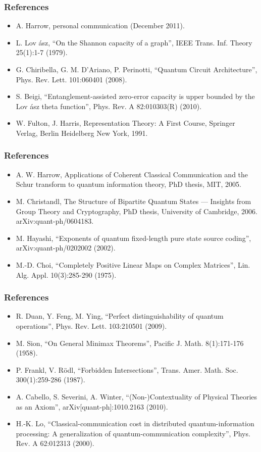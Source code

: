 \documentclass{beamer}
\begin{document}
\begin{frame}
\frametitle{References}

\begin{itemize}
\item A. Harrow, personal communication (December 2011).
\item L. Lov \'{a}sz, “On the Shannon capacity of a graph”, IEEE Trans. Inf. Theory 25(1):1-7 (1979).
\item G. Chiribella, G. M. D’Ariano, P. Perinotti, “Quantum Circuit Architecture”, Phys. Rev. Lett. 101:060401
(2008).
\item S. Beigi, “Entanglement-assisted zero-error capacity is upper bounded by the Lov \'{a}sz theta function”,
Phys. Rev. A 82:010303(R) (2010).
\item W. Fulton, J. Harris, Representation Theory: A First Course, Springer Verlag, Berlin Heidelberg New
York, 1991.

\end{itemize}
\end{frame}

\begin{frame}
\frametitle{References}

\begin{itemize}
\item   A. W. Harrow, Applications of Coherent Classical Communication and the Schur transform to quantum information theory, PhD thesis, MIT, 2005.
\item M. Christandl, The Structure of Bipartite Quantum States — Insights from Group Theory and Cryptography,
PhD thesis, University of Cambridge, 2006. arXiv:quant-ph/0604183.
\item M. Hayashi, “Exponents of quantum fixed-length pure state source coding”, arXiv:quant-ph/0202002
(2002).
\item M.-D. Choi, “Completely Positive Linear Maps on Complex Matrices”, Lin. Alg. Appl. 10(3):285-290
(1975).

\end{itemize}
\end{frame}

\begin{frame}
\frametitle{References}

\begin{itemize}
\item R. Duan, Y. Feng, M. Ying, “Perfect distinguishability of quantum operations”, Phys. Rev. Lett.
103:210501 (2009).
\item M. Sion, “On General Minimax Theorems”, Pacific J. Math. 8(1):171-176 (1958).
\item    P. Frankl, V. R\"{o}dl, “Forbidden Intersections”, Trans. Amer. Math. Soc. 300(1):259-286 (1987).
\item A. Cabello, S. Severini, A. Winter, “(Non-)Contextuality of Physical Theories as an Axiom”,
arXiv[quant-ph]:1010.2163 (2010).
\item H.-K. Lo, “Classical-communication cost in distributed quantum-information processing: A generalization of quantum-communication complexity”, Phys. Rev. A 62:012313 (2000).

\end{itemize}
\end{frame}
\end{document}

